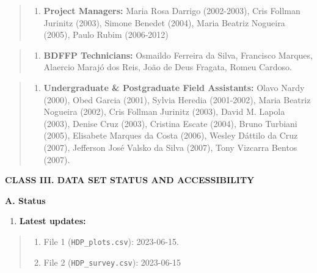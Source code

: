 \documentclass[
  man, donotrepeattitle,floatsintext]{apa6}
\providecommand{\tightlist}{%
  \setlength{\itemsep}{0pt}\setlength{\parskip}{0pt}}
\begin{document}
\begin{quote}
\begin{enumerate}
\def\labelenumi{\alph{enumi}.}
\tightlist
\item
  \textbf{Project Managers:} Maria Rosa Darrigo (2002-2003), Cris Follman Jurinitz (2003), Simone Benedet (2004), Maria Beatriz Nogueira (2005), Paulo Rubim (2006-2012)
\end{enumerate}
\end{quote}

\begin{quote}
\begin{enumerate}
\def\labelenumi{\alph{enumi}.}
\setcounter{enumi}{1}
\tightlist
\item
  \textbf{BDFFP Technicians:} Osmaildo Ferreira da Silva, Francisco Marques, Alaercio Marajó dos Reis, João de Deus Fragata, Romeu Cardoso.
\end{enumerate}
\end{quote}

\begin{quote}
\begin{enumerate}
\def\labelenumi{\alph{enumi}.}
\setcounter{enumi}{2}
\tightlist
\item
  \textbf{Undergraduate \& Postgraduate Field Assistants:} Olavo Nardy (2000), Obed Garcia (2001), Sylvia Heredia (2001-2002), Maria Beatriz Nogueira (2002), Cris Follman Jurinitz (2003), David M. Lapola (2003), Denise Cruz (2003), Cristina Escate (2004), Bruno Turbiani (2005), Elisabete Marques da Costa (2006), Wesley Dáttilo da Cruz (2007), Jefferson José Valsko da Silva (2007), Tony Vizcarra Bentos (2007).
\end{enumerate}
\end{quote}

\noindent  
\textbf{CLASS III. DATA SET STATUS AND ACCESSIBILITY}

\noindent  
\textbf{A. Status}

\begin{enumerate}
\def\labelenumi{\arabic{enumi}.}
\tightlist
\item
  \textbf{Latest updates:}
\end{enumerate}

\begin{quote}
\begin{enumerate}
\def\labelenumi{\alph{enumi}.}
\tightlist
\item
  File 1 (\texttt{HDP\_plots.csv}): 2023-06-15.
\item
  File 2 (\texttt{HDP\_survey.csv}): 2023-06-15
\end{enumerate}
\end{quote}
\end{document}
